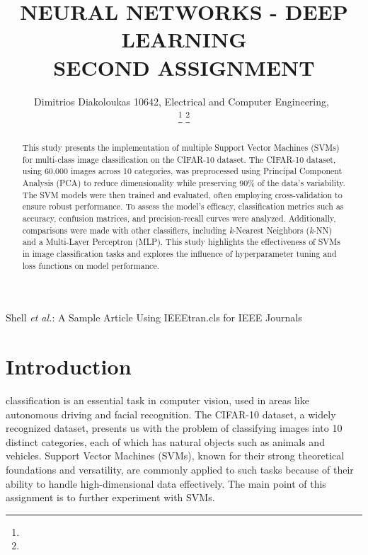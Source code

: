 \documentclass[lettersize,journal]{IEEEtran}
\begin{document}
\title{NEURAL NETWORKS - DEEP LEARNING \\ SECOND ASSIGNMENT}

\author{Dimitrios Diakoloukas 10642, Electrical and Computer Engineering,~

\thanks{}
\thanks{}}

%
{Shell \MakeLowercase{\textit{et al.}}: A Sample Article Using IEEEtran.cls for IEEE Journals}

\maketitle

\begin{abstract}
This study presents the implementation of multiple Support Vector Machines (SVMs) for multi-class image classification on the CIFAR-10 dataset. The CIFAR-10 dataset, using 60,000 images across 10 categories, was preprocessed using Principal Component Analysis (PCA) to reduce dimensionality while preserving 90\% of the data's variability. The SVM models were then trained and evaluated, often employing cross-validation to ensure robust performance. 
To assess the model's efficacy, classification metrics such as accuracy, confusion matrices, and precision-recall curves were analyzed. Additionally, comparisons were made with other classifiers, including \textit{k}-Nearest Neighbors (\textit{k}-NN) and a Multi-Layer Perceptron (MLP). This study highlights the effectiveness of SVMs in image classification tasks and explores the influence of hyperparameter tuning and loss functions on model performance.
\end{abstract}

\section{\textbf{Introduction}}
 classification is an essential task in computer vision, used in areas like autonomous driving and facial recognition. The CIFAR-10 dataset, a widely recognized dataset, presents us with the problem of classifying images into 10 distinct categories, each of which has natural objects such as animals and vehicles. Support Vector Machines (SVMs), known for their strong theoretical foundations and versatility, are commonly applied to such tasks because of their ability to handle high-dimensional data effectively. The main point of this assignment is to further experiment with SVMs.
\end{document}
